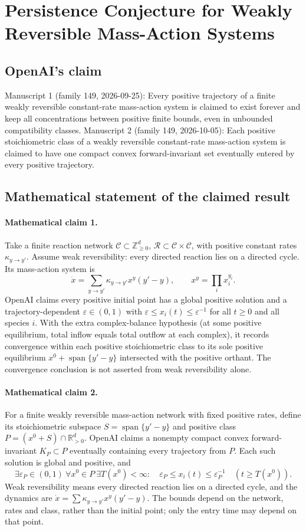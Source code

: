 \documentclass[11pt]{article}
\begin{document}
\section*{Persistence Conjecture for Weakly Reversible Mass-Action Systems}

\subsection{OpenAI's claim}
Manuscript 1 (family 149, 2026-09-25): Every positive trajectory of a finite weakly reversible constant-rate mass-action system is claimed to exist forever and keep all concentrations between positive finite bounds, even in unbounded compatibility classes. Manuscript 2 (family 149, 2026-10-05): Each positive stoichiometric class of a weakly reversible constant-rate mass-action system is claimed to have one compact convex forward-invariant set eventually entered by every positive trajectory.

\subsection{Mathematical statement of the claimed result}
\paragraph{Mathematical claim 1.} Take a finite reaction network $\mathcal C\subset\mathbb Z_{\ge0}^d$, $\mathcal R\subset\mathcal C\times\mathcal C$, with positive constant rates $\kappa_{y\to y'}$. Assume weak reversibility: every directed reaction lies on a directed cycle. Its mass-action system is
\[
\dot x=\sum_{y\to y'}\kappa_{y\to y'}x^y(y'-y),\qquad x^y=\prod_i x_i^{y_i}.
\]
OpenAI claims every positive initial point has a global positive solution and a trajectory-dependent $\varepsilon\in(0,1)$ with $\varepsilon\le x_i(t)\le\varepsilon^{-1}$ for all $t\ge0$ and all species $i$.
With the extra complex-balance hypothesis (at some positive equilibrium, total inflow equals total outflow at each complex), it records convergence within each positive stoichiometric class to its sole positive equilibrium $x^0+\operatorname{span}\{y'-y\}$ intersected with the positive orthant. The convergence conclusion is not asserted from weak reversibility alone.

\paragraph{Mathematical claim 2.} For a finite weakly reversible mass-action network with fixed positive rates, define its stoichiometric subspace $S=\operatorname{span}\{y'-y\}$ and positive class $P=(x^0+S)\cap\mathbb R_{>0}^d$. OpenAI claims a nonempty compact convex forward-invariant $K_P\subset P$ eventually containing every trajectory from $P$. Each such solution is global and positive, and
\[
\exists\varepsilon_P\in(0,1)\ \forall x^0\in P\ \exists T(x^0)<\infty:\quad
\varepsilon_P\le x_i(t)\le\varepsilon_P^{-1}\quad(t\ge T(x^0)).
\]
Weak reversibility means every directed reaction lies on a directed cycle, and the dynamics are $\dot x=\sum\kappa_{y\to y'}x^y(y'-y)$. The bounds depend on the network, rates and class, rather than the initial point; only the entry time may depend on that point.
\end{document}
